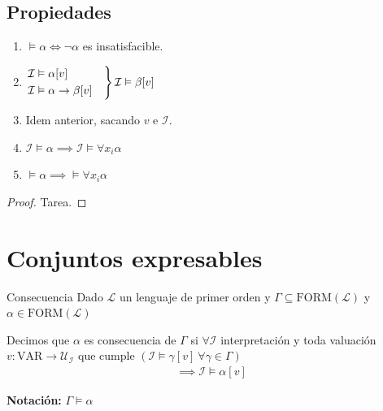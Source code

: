 \subsection{Propiedades}

\begin{enumerate}
    \item $\vDash \alpha \iff \neg \alpha$ es insatisfacible.
    \item $\begin{rcases*}
            \mathcal{I} \vDash \alpha[v] & \\
            \mathcal{I} \vDash \alpha \to \beta[v] &
        \end{rcases*}
        \mathcal{I} \vDash \beta[v]$
    \item Idem anterior, sacando $v$ e $\mathcal{I}$.
    \item $\mathcal{I} \vDash \alpha
        \implies
        \mathcal{I} \vDash \forall x_i \alpha$
    \item $\vDash \alpha \implies \vDash \forall x_i \alpha$
\end{enumerate}

\begin{proof} 
    Tarea.
\end{proof}

\section{Conjuntos expresables}

\begin{definicion}{Consecuencia}{}
    Dado $\mathcal{L}$ un lenguaje de primer orden y 
    $\Gamma \subseteq \mathrm{FORM}(\mathcal{L})$
    y
    $\alpha \in \mathrm{FORM}(\mathcal{L})$

    \medskip

    Decimos que $\alpha$ es consecuencia de $\Gamma$ si
    $\forall \mathcal{I}$ interpretación y toda valuación 
    $v: \mathrm{VAR} \to \mathcal{U}_{\mathcal{I}}$
    que cumple
    $\left(\mathcal{I} \vDash \gamma[v] ~ \forall \gamma \in \Gamma\right)$
    \begin{gather*}
        \implies \mathcal{I} \vDash \alpha [v]
    \end{gather*}

    \bigskip
    \textbf{Notación:}
    $\Gamma \vDash \alpha$
\end{definicion}

\medskip

